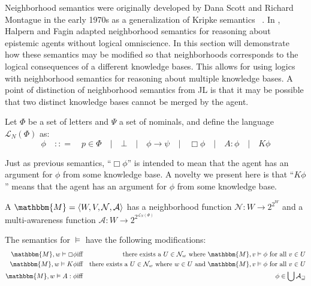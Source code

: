 Neighborhood semantics were originally developed by Dana Scott and Richard
Montague in the early 1970s as a generalization of Kripke semantics \
{\cite{montague_universal_2008,scott_advice_1970}}.  In
{\cite{fagin_belief_1988}}, Halpern and Fagin adapted neighborhood semantics
for reasoning about epistemic agents without logical omniscience.  In this
section will demonstrate how these semantics may be modified so that
neighborhoods corresponds to the logical consequences of a different knowledge
bases.  This allows for using logics with neighborhood semantics for
reasoning about multiple knowledge bases.  A point of distinction of
neighborhood semantics from JL is that it may be possible that two distinct
knowledge bases cannot be merged by the agent.

\begin{definition}
  Let $\Phi$ be a set of letters and $\Psi$ a set of nominals, and define the
  language $\mathcal{L}_N (\Phi)$ as:
  \[ \phi \hspace{1em} : : = \hspace{1em} p \in \Phi \hspace{1em} |
     \hspace{1em} \bot \hspace{1em} | \hspace{1em} \phi \rightarrow \psi
     \hspace{1em} | \hspace{1em} \Box \phi \hspace{1em} | \hspace{1em} A :
     \phi \hspace{1em} | \hspace{1em} K \phi \]
\end{definition}

Just as previous semantics, ``$\Box \phi$'' is intended to mean that the agent
has an argument for $\phi$ from some knowledge base.  A novelty we present
here is that ``$K \phi$'' means that the agent has an argument for $\phi$ from
some \tmtextit{sound} knowledge base.



\begin{definition}
  \label{neighborhoodmodels}A {} $\mathbbm{M}=
  \langle W, V, \mathcal{N}, \mathcal{A} \rangle$ has a neighborhood function
  $\mathcal{N} : W \rightarrow 2^{2^W}$ and a multi-awareness function
  $\mathcal{A} : W \rightarrow 2^{2^{\mathcal{L}_N (\Phi)}}$
  
  
  
  The semantics for $\vDash$ have the following modifications:
  \begin{eqnarray*}
    \mathbbm{M}, w \vDash \Box \phi & \text{iff} & \text{there exists a $U \in
    \mathcal{N}_w$ where $\mathbbm{M}, v \vDash \phi$ for all $v \in U$}\\
    \mathbbm{M}, w \vDash K \phi & \text{iff} & \text{there exists a $U \in
    \mathcal{N}_w$ where $w \in U$ and $\mathbbm{M}, v \vDash \phi$ for all $v
    \in U$}\\
    \mathbbm{M}, w \vDash A : \phi & \text{iff} & \phi \in \bigcup
    \mathcal{A_w}
  \end{eqnarray*}
\end{definition}

